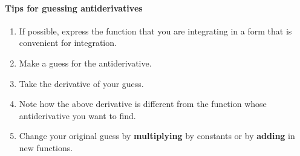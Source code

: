 \documentclass{ximera}
\begin{document}
\paragraph{Tips for guessing antiderivatives}
\begin{enumerate}
\item If possible, express the function that you are integrating in a form that is convenient for integration.
\item Make a guess for the antiderivative.
\item Take the derivative of your guess.
\item Note how the above derivative is different from the function
  whose antiderivative you want to find.
\item Change your original guess by \textbf{multiplying} by constants
  or by \textbf{adding} in new functions.
\end{enumerate}
\end{document}
